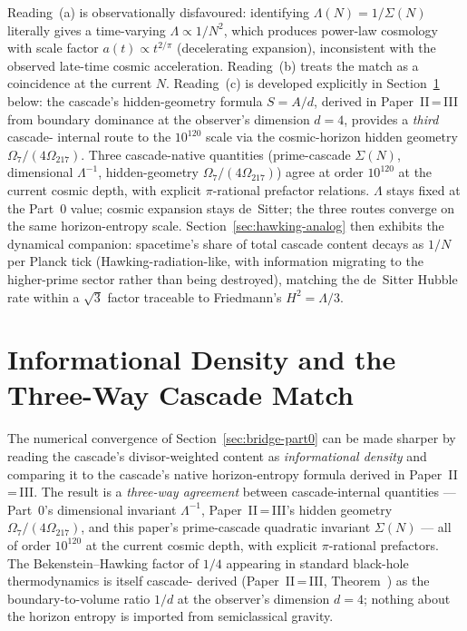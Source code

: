 \documentclass[11pt,a4paper]{article}
\begin{document}
\noindent Reading~(a) is observationally disfavoured: identifying
$\Lambda(N) = 1/\Sigma(N)$ literally gives a time-varying $\Lambda
\propto 1/N^2$, which produces power-law cosmology with scale factor
$a(t) \propto t^{2/\pi}$ (decelerating expansion), inconsistent with
the observed late-time cosmic acceleration. Reading~(b) treats the
match as a coincidence at the current $N$. Reading~(c) is developed
explicitly in Section~\ref{sec:holographic-match} below: the
cascade's hidden-geometry formula $S = A/d$, derived in
Paper~II\,=\,III\,\cite{part23} from boundary dominance at the
observer's dimension $d = 4$, provides a \emph{third} cascade-
internal route to the $10^{120}$ scale via the cosmic-horizon
hidden geometry $\Omega_7/(4\Omega_{217})$. Three cascade-native
quantities (prime-cascade $\Sigma(N)$, dimensional $\Lambda^{-1}$,
hidden-geometry $\Omega_7/(4\Omega_{217})$) agree at order $10^{120}$
at the current cosmic depth, with explicit $\pi$-rational
prefactor relations. $\Lambda$ stays fixed at the Part~0 value;
cosmic expansion stays de~Sitter; the three routes converge on the
same horizon-entropy scale.
Section~\ref{sec:hawking-analog} then exhibits the dynamical
companion: spacetime's share of total cascade content decays as
$1/N$ per Planck tick (Hawking-radiation-like, with information
migrating to the higher-prime sector rather than being destroyed),
matching the de~Sitter Hubble rate within a $\sqrt{3}$ factor
traceable to Friedmann's $H^2 = \Lambda/3$.

\section{Informational Density and the Three-Way Cascade Match}\label{sec:holographic-match}

The numerical convergence of Section~\ref{sec:bridge-part0} can be
made sharper by reading the cascade's divisor-weighted content as
\emph{informational density} and comparing it to the cascade's
native horizon-entropy formula derived in Paper~II\,=\,III. The
result is a \emph{three-way agreement} between cascade-internal
quantities --- Part~0's dimensional invariant $\Lambda^{-1}$,
Paper~II\,=\,III's hidden geometry $\Omega_7/(4\Omega_{217})$, and
this paper's prime-cascade quadratic invariant $\Sigma(N)$ --- all
of order $10^{120}$ at the current cosmic depth, with explicit
$\pi$-rational prefactors. The Bekenstein--Hawking factor of $1/4$
appearing in standard black-hole thermodynamics is itself cascade-
derived (Paper~II\,=\,III, Theorem~) as the
boundary-to-volume ratio $1/d$ at the observer's dimension
$d = 4$; nothing about the horizon entropy is imported from
semiclassical gravity.
\end{document}
